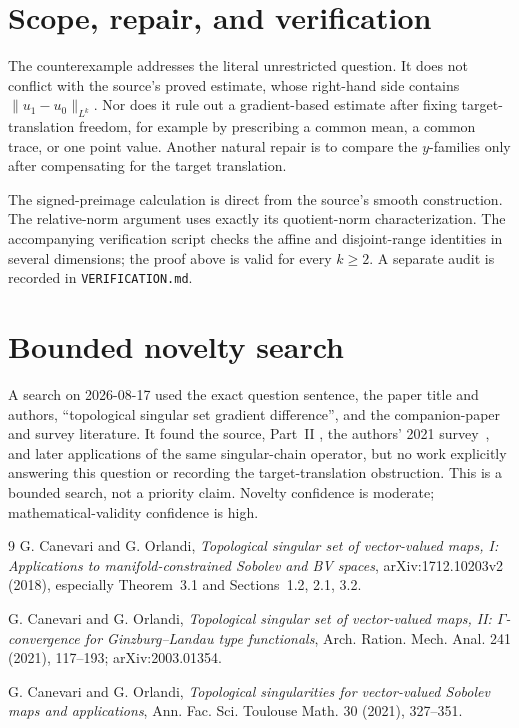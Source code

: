\documentclass[11pt]{article}
\begin{document}
\section{Scope, repair, and verification}
The counterexample addresses the literal unrestricted question.  It does
not conflict with the source's proved estimate, whose right-hand side
contains $\|u_1-u_0\|_{L^k}$.  Nor does it rule out a gradient-based estimate
after fixing target-translation freedom, for example by prescribing a
common mean, a common trace, or one point value.  Another natural repair is
to compare the $y$-families only after compensating for the target
translation.

The signed-preimage calculation is direct from the source's smooth
construction.  The relative-norm argument uses exactly its quotient-norm
characterization.  The accompanying verification script checks the affine
and disjoint-range identities in several dimensions; the proof above is
valid for every $k\ge2$.  A separate audit is recorded in
\texttt{VERIFICATION.md}.

\section{Bounded novelty search}
A search on 2026-08-17 used the exact question sentence, the paper title and
authors, ``topological singular set gradient difference'', and the
companion-paper and survey literature.  It found the source, Part~II
\cite{CO2}, the authors' 2021 survey~\cite{survey}, and later applications of
the same singular-chain operator, but no work explicitly answering this
question or recording the target-translation obstruction.  This is a
bounded search, not a priority claim.  Novelty confidence is moderate;
mathematical-validity confidence is high.

\begin{thebibliography}{9}
G. Canevari and G. Orlandi,
\emph{Topological singular set of vector-valued maps, I: Applications to
manifold-constrained Sobolev and BV spaces}, arXiv:1712.10203v2 (2018),
especially Theorem~3.1 and Sections~1.2, 2.1, 3.2.

G. Canevari and G. Orlandi,
\emph{Topological singular set of vector-valued maps, II:
$\Gamma$-convergence for Ginzburg--Landau type functionals},
Arch. Ration. Mech. Anal. 241 (2021), 117--193; arXiv:2003.01354.

G. Canevari and G. Orlandi,
\emph{Topological singularities for vector-valued Sobolev maps and
applications}, Ann. Fac. Sci. Toulouse Math. 30 (2021), 327--351.
\end{thebibliography}
\end{document}
